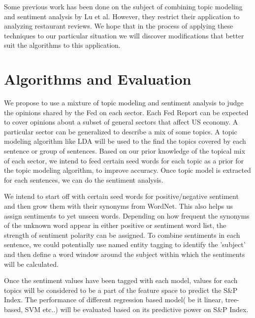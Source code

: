 \documentclass{sig-alternate-05-2015}
\begin{document}
Some previous work has been done on the subject of combining topic modeling and
sentiment analysis by Lu et al.\cite{lu:2011} However, they restrict their application to analyzing
restaurant reviews. We hope that in the process of applying these techniques to our
particular situation we will discover modifications that better suit the algorithms
to this application.

\section{Algorithms and Evaluation}
We propose to use a mixture of topic modeling and sentiment analysis to judge the opinions shared by the Fed on each sector. Each Fed Report can be expected to cover opinions about a subset of  general sectors that affect US economy. A particular sector can be generalized to describe a  mix of some topics.  A topic modeling algorithm like LDA\cite{blei:lda} will be used to  the find the topics covered by each sentence or group of sentences. Based on our prior knowledge of the topical mix of each sector, we intend to feed certain seed words for each topic as a  prior for the topic modeling algorithm, to improve accuracy. Once topic model is extracted for each sentences, we can do the sentiment analysis.
 
We intend to start off with certain seed words for positive/negative sentiment and then grow them with their synonyms from WordNet\cite{kim:dso}. This  also helps us assign sentiments to yet unseen words. Depending on how frequent the synonyms of the unknown word appear in either positive or sentiment word list, the strength of sentiment polarity can be assigned. To combine sentiments in each sentence, we could potentially use named entity tagging to identify the 'subject' and then define a word window around the subject within which the sentiments will be calculated.

Once the sentiment values have been tagged with each model, values for each topics will be considered to be  a part of the feature space to predict the S\&P Index. The performance of different regression based model( be it linear, tree-based, SVM etc..)  will be evaluated based on its predictive power on S\&P Index.


%
%

%
%

%
%
\end{document}
